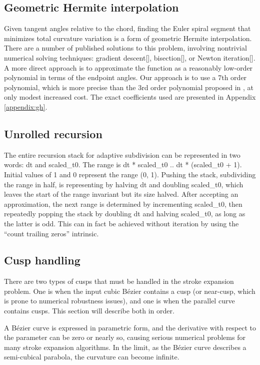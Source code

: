 \documentclass[sigconf]{acmart}
\begin{document}
\subsection{Geometric Hermite interpolation}

Given tangent angles relative to the chord, finding the Euler spiral segment that minimizes total curvature variation is a form of geometric Hermite interpolation. There are a number of published solutions to this problem, involving nontrivial numerical solving techniques: gradient descent[], bisection[], or Newton iteration[]. A more direct approach is to approximate the function as a reasonably low-order polynomial in terms of the endpoint angles. Our approach is to use a 7th order polynomial, which is more precise than the 3rd order polynomial proposed in \citet{Reif2021}, at only modest increased cost. The exact coefficients used are presented in Appendix \ref{appendix:gh}.

\subsection{Unrolled recursion}

The entire recursion stack for adaptive subdivision can be represented in two words: dt and scaled\_t0. The range is dt * scaled\_t0 .. dt * (scaled\_t0 + 1). Initial values of 1 and 0 represent the range (0, 1). Pushing the stack, subdividing the range in half, is representing by halving dt and doubling scaled\_t0, which leaves the start of the range invariant but its size halved. After accepting an approximation, the next range is determined by incrementing scaled\_t0, then repeatedly popping the stack by doubling dt and halving scaled\_t0, as long as the latter is odd. This can in fact be achieved without iteration by using the ``count trailing zeros'' intrinsic.

\subsection{Cusp handling}

There are two types of cusps that must be handled in the stroke expansion problem. One is when the input cubic Bézier contains a cusp (or near-cusp, which is prone to numerical robustness issues), and one is when the parallel curve contains cusps. This section will describe both in order.

A Bézier curve is expressed in parametric form, and the derivative with respect to the parameter can be zero or nearly so, causing serious numerical problems for many stroke expansion algorithms. In the limit, as the Bézier curve describes a semi-cubical parabola, the curvature can become infinite.
\end{document}
